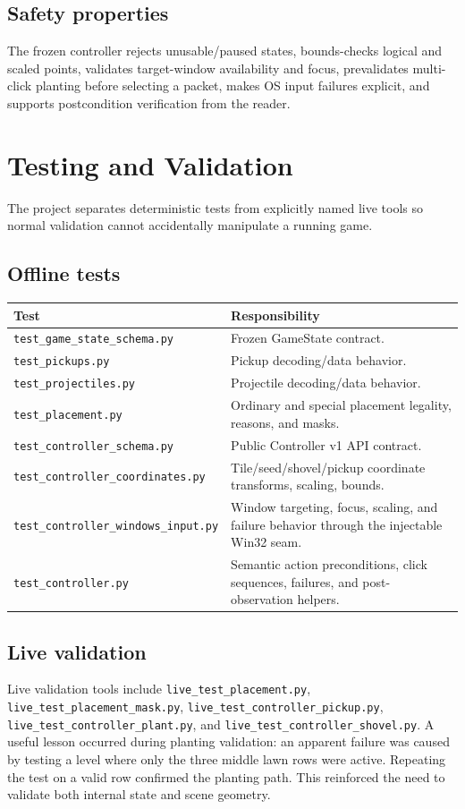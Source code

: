 \documentclass[11pt,a4paper]{article}
\begin{document}
\subsection{Safety properties}
The frozen controller rejects unusable/paused states, bounds-checks logical and scaled points, validates target-window availability and focus, prevalidates multi-click planting before selecting a packet, makes OS input failures explicit, and supports postcondition verification from the reader.
\section{Testing and Validation}
The project separates deterministic tests from explicitly named live tools so normal validation cannot accidentally manipulate a running game.
\subsection{Offline tests}
\begin{longtable}{p{}p{}}
\toprule Test & Responsibility \\
\midrule\endhead
\texttt{test\_game\_state\_schema.py} & Frozen GameState contract. \\
\texttt{test\_pickups.py} & Pickup decoding/data behavior. \\
\texttt{test\_projectiles.py} & Projectile decoding/data behavior. \\
\texttt{test\_placement.py} & Ordinary and special placement legality, reasons, and masks. \\
\texttt{test\_controller\_schema.py} & Public Controller v1 API contract. \\
\texttt{test\_controller\_coordinates.py} & Tile/seed/shovel/pickup coordinate transforms, scaling, bounds. \\
\texttt{test\_controller\_windows\_input.py} & Window targeting, focus, scaling, and failure behavior through the injectable Win32 seam. \\
\texttt{test\_controller.py} & Semantic action preconditions, click sequences, failures, and post-observation helpers. \\
\bottomrule
\end{longtable}
\subsection{Live validation}
Live validation tools include \texttt{live\_test\_placement.py}, \texttt{live\_test\_placement\_mask.py}, \texttt{live\_test\_controller\_pickup.py}, \texttt{live\_test\_controller\_plant.py}, and \texttt{live\_test\_controller\_shovel.py}. A useful lesson occurred during planting validation: an apparent failure was caused by testing a level where only the three middle lawn rows were active. Repeating the test on a valid row confirmed the planting path. This reinforced the need to validate both internal state and scene geometry.
\end{document}
